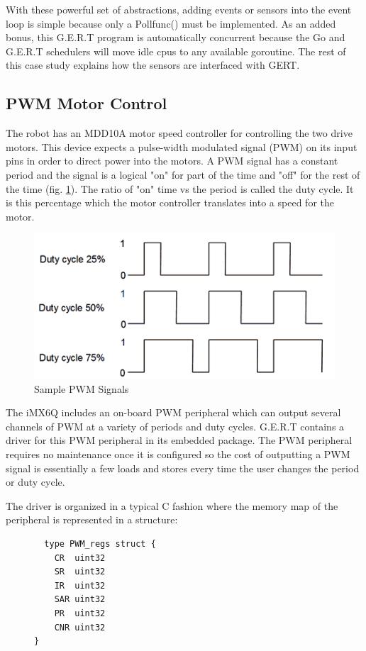 With these powerful set of abstractions, adding events or sensors into the event loop
is simple because only a Pollfunc() must be implemented. As an added bonus, this
G.E.R.T program is automatically concurrent because the Go and G.E.R.T schedulers will
move idle cpus to any available goroutine. The rest of this case study explains how the sensors
are interfaced with GERT.


\subsection{PWM Motor Control}
The robot has an MDD10A motor speed controller for controlling the two drive motors. This device
expects a pulse-width modulated signal (PWM) on its input pins in order to direct power into the
motors. A PWM signal has a constant period and the signal is a logical "on" for part of the time
and "off" for the rest of the time (fig. \ref{fig:pwm}). The ratio of "on" time vs the period is called the duty cycle.
It is this percentage which the motor controller translates into a speed for the motor.

\begin{figure}[h]
\begin{center}
  \includegraphics[scale=0.5]{pwm}
\end{center}
  \caption{Sample PWM Signals} \label{fig:pwm}
\end{figure}


The iMX6Q includes an on-board PWM peripheral which can output several channels of PWM
at a variety of periods and duty cycles. G.E.R.T contains a driver for this PWM peripheral in its embedded
package. The PWM peripheral requires no maintenance once it is configured so the cost of outputting
a PWM signal is essentially a few loads and stores every time the user changes the period or duty cycle.

The driver is organized in a typical C fashion where the memory map of the peripheral is represented in a structure:
\begin{figure}[h]
  \begin{lstlisting}
  type PWM_regs struct {
	CR  uint32
	SR  uint32
	IR  uint32
	SAR uint32
	PR  uint32
	CNR uint32
}
  \end{lstlisting}
\end{figure}

